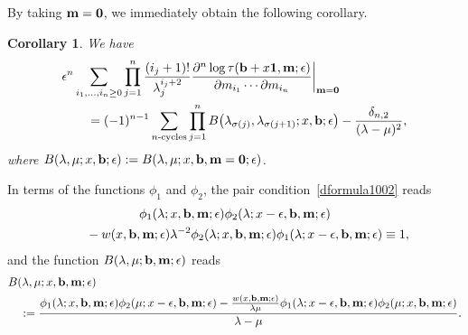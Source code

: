 \documentclass[11pt]{article}
\numberwithin{equation}{section}
\newcommand{\e}{\epsilon}
\newcommand{\p}{\partial}
\newcommand{\nn}{\nonumber}
\numberwithin{equation}{section}
\newtheorem{Corollary}[Theorem]{Corollary}
\begin{document}
By taking ${\bf m}={\bf 0}$, we immediately obtain the following corollary.
\begin{Corollary} We have
\begin{align}
& \e^n\sum_{i_1,\dots,i_n\ge0}
\prod_{j=1}^n \frac{(i_j+1)!}{\lambda_j^{i_j+2}} \frac{\p^n \log \tau({\bf b}+x{\bf 1},{\bf m};\e)}{\p m_{i_1} \cdots \p m_{i_n}}\bigg|_{{\bf m}={\bf 0}}
\nn\\
& \qquad{} = (-1)^{n-1}
\sum_{\text{$n$-cycles}}
\prod_{j=1}^n B\bigl(\lambda_{\sigma(j)},\lambda_{\sigma(j+1)}; x, {\bf b};\e\bigr) - \frac{\delta_{n,2}}{(\lambda-\mu)^2},\label{Y926-ext}
\end{align}
where $B(\lambda,\mu; x, {\bf b};\e):=B(\lambda,\mu; x, {\bf b},{\bf m}={\bf 0};\e)$.
\end{Corollary}

In terms of the functions $\phi_1$ and $\phi_2$, the pair condition~\eqref{dformula1002} reads
\begin{gather}
\phi_1(\lambda; x, {\bf b}, {\bf m};\e) \phi_2(\lambda; x-\e, {\bf b}, {\bf m};\e)\nn \\
\qquad{}- w(x, {\bf b}, {\bf m};\e)
\lambda^{-2} \phi_2(\lambda; x, {\bf b}, {\bf m};\e) \phi_1(\lambda; x-\e, {\bf b}, {\bf m};\e) \equiv 1,\label{pairconditionphi}
\end{gather}
and the function $B(\lambda,\mu;{\bf b},{\bf m};\e)$ reads
\begin{align}
&B(\lambda,\mu; x, {\bf b}, {\bf m};\e) \label{Bphiab} \\
&\quad{}:= \frac{\phi_1(\lambda; x, {\bf b}, {\bf m};\e) \phi_2(\mu; x-\e,{\bf b}, {\bf m};\e)
- \frac{w(x, {\bf b}, {\bf m};\e)}{\lambda\mu} \phi_1(\lambda; x-\e,{\bf b}, {\bf m};\e) \phi_2(\mu; x, {\bf b}, {\bf m};\e)}{\lambda-\mu}. \nn
\end{align}
\end{document}
